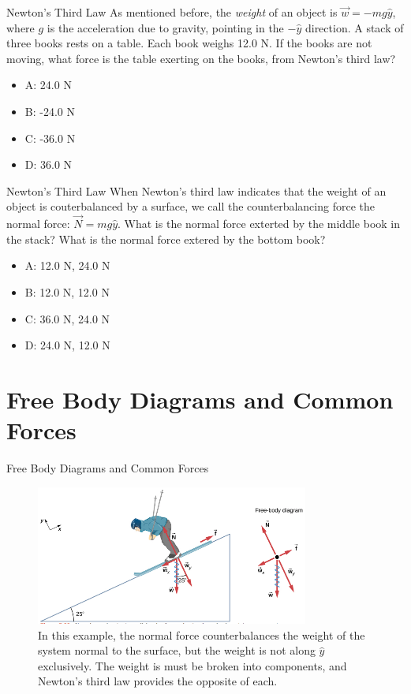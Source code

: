 \documentclass{beamer}
\begin{document}
\begin{frame}{Newton's Third Law}
As mentioned before, the \textit{weight} of an object is $\vec{w} = -mg\hat{y}$, where $g$ is the acceleration due to gravity, pointing in the $-\hat{y}$ direction.  A stack of three books rests on a table.  Each book weighs 12.0 N.  If the books are not moving, what force is the table exerting on the books, from Newton's third law?
\begin{itemize}
\item A: 24.0 N
\item B: -24.0 N
\item C: -36.0 N
\item D: 36.0 N
\end{itemize}
\end{frame}

\begin{frame}{Newton's Third Law}
When Newton's third law indicates that the weight of an object is couterbalanced by a surface, we call the counterbalancing force the \alert{normal force}: $\vec{N} = mg\hat{y}$.  What is the normal force exterted by the middle book in the stack?  What is the normal force extered by the bottom book?
\begin{itemize}
\item A: 12.0 N, 24.0 N
\item B: 12.0 N, 12.0 N
\item C: 36.0 N, 24.0 N
\item D: 24.0 N, 12.0 N
\end{itemize}
\end{frame}

\section{Free Body Diagrams and Common Forces}

\begin{frame}{Free Body Diagrams and Common Forces}
\begin{figure}
\centering
\includegraphics[width=0.8\textwidth,trim=0cm 0.1cm 0cm 0cm,clip=true]{figures/incline.png}
\caption{\label{fig:incline} In this example, the normal force counterbalances the weight of the system normal to the surface, but the weight is not along $\hat{y}$ exclusively.  The weight is must be broken into components, and Newton's third law provides the opposite of each.}
\end{figure}
\end{frame}
\end{document}
